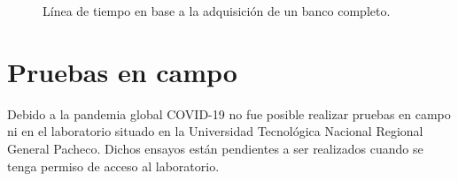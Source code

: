 \vspace{5mm}
\begin{figure}[ht]
\caption{Línea de tiempo en base a la adquisición de un banco completo.}
\label{fig:lineaDeTiempo}
\end{figure}
\vspace{5mm}

\section{Pruebas en campo}
Debido a la pandemia global COVID-19 no fue posible realizar pruebas en campo ni en el laboratorio situado en la Universidad Tecnológica Nacional Regional General Pacheco. Dichos ensayos están pendientes a ser realizados cuando se tenga permiso de acceso al laboratorio.